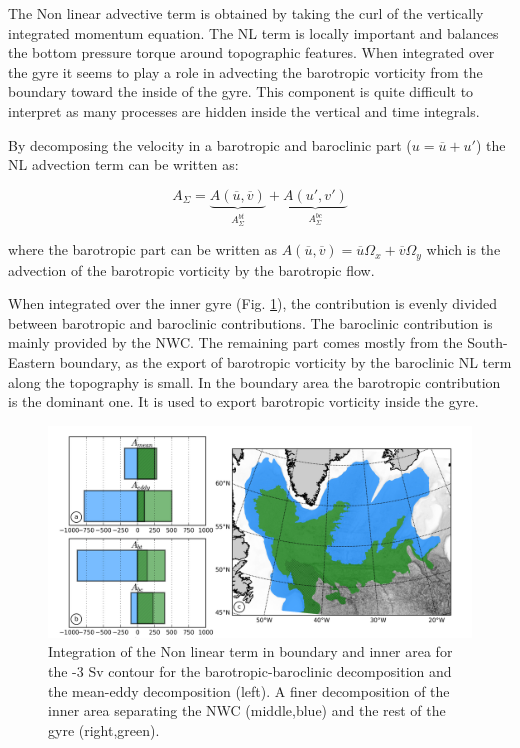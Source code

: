 \documentclass[11pt,a4paper]{article}
\begin{document}
The Non linear advective term is obtained by taking the curl of the vertically integrated momentum equation. The NL term is locally important and balances the bottom pressure torque around topographic features. When integrated over the gyre it seems to play a role in advecting the barotropic vorticity from the boundary toward the inside of the gyre. This component is quite difficult to interpret as  many processes are hidden inside the vertical and time integrals. 

By decomposing the velocity in a barotropic and baroclinic part ($u = \overline{u} + u'$) the NL advection term can be written as:

$$A_{\Sigma}=\underbrace{A(\overline{u},\overline{v})}_{A^{bt}_{\Sigma}}+\underbrace{A(u',v')}_{A^{bc}_{\Sigma}}$$

where the barotropic part can be written as $A(\overline{u},\overline{v})= \overline{u}\Omega _x +\overline{v}\Omega _y$ which is the advection of the barotropic vorticity by the barotropic flow.  

When integrated over the inner gyre (Fig. \ref{int_NL}), the contribution is evenly divided between barotropic and baroclinic contributions. The baroclinic contribution is mainly provided by the NWC. The remaining part comes mostly from the South-Eastern boundary, as the export of barotropic vorticity by the baroclinic NL term along the topography is small. In the boundary area the barotropic contribution is the dominant one. It is used to export barotropic vorticity inside the gyre.  %

\begin{figure}[H]
\centerline{\includegraphics[width=15cm]{./v_b/int_NL_bound_in.png}}
\caption{Integration of the Non linear term in boundary and inner area for the -3 Sv contour for  the barotropic-baroclinic decomposition and the mean-eddy decomposition (left). A finer decomposition of the inner area separating the NWC (middle,blue) and the rest of the gyre (right,green).}
\label{int_NL}
\end{figure} 
\end{document}
